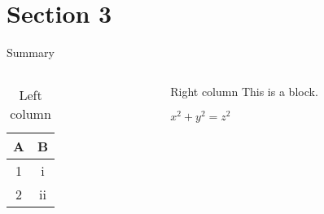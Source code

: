 \documentclass{beamer}
\begin{document}
\section{Section 3}
\begin{frame}[label={summary}]{Summary}
\begin{columns}
	\begin{column}{0.5\textwidth}
		\begin{table}
			\begin{tabular}{| c | c |}
			    \hline
			    A & B \\
			    \hline
			    1 & i \\
			    2 & ii \\ 
			    \hline
			\end{tabular}
			\caption{Left column}
		\end{table}
	\end{column}
	\begin{column}{0.5\textwidth}
		\begin{block}{Right column}
			This is a block.
		\end{block}
		\begin{theorem} %
			$x^2+y^2=z^2$
		\end{theorem}
		\hyperlink{slide1}{}
	\end{column}
\end{columns}
\end{frame}
\end{document}
